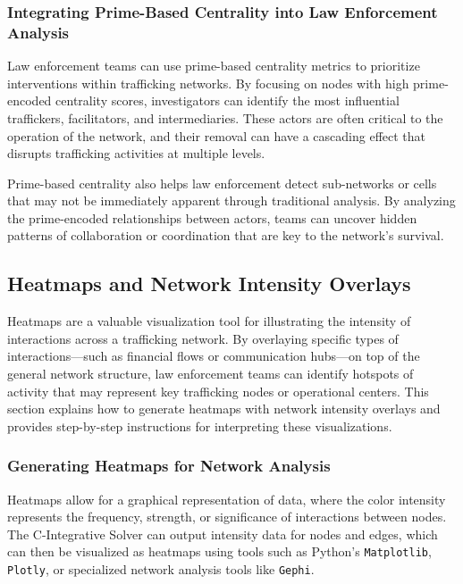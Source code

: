 \documentclass[%
 preprint, linenumbers,
 amsmath,amssymb,
 aps, physrev,
]{revtex4-2}
\begin{document}
\subsubsection{Integrating Prime-Based Centrality into Law Enforcement Analysis}

Law enforcement teams can use prime-based centrality metrics to prioritize interventions within trafficking networks. By focusing on nodes with high prime-encoded centrality scores, investigators can identify the most influential traffickers, facilitators, and intermediaries. These actors are often critical to the operation of the network, and their removal can have a cascading effect that disrupts trafficking activities at multiple levels.

Prime-based centrality also helps law enforcement detect sub-networks or cells that may not be immediately apparent through traditional analysis. By analyzing the prime-encoded relationships between actors, teams can uncover hidden patterns of collaboration or coordination that are key to the network’s survival.

\subsection{Heatmaps and Network Intensity Overlays}

Heatmaps are a valuable visualization tool for illustrating the intensity of interactions across a trafficking network. By overlaying specific types of interactions—such as financial flows or communication hubs—on top of the general network structure, law enforcement teams can identify hotspots of activity that may represent key trafficking nodes or operational centers. This section explains how to generate heatmaps with network intensity overlays and provides step-by-step instructions for interpreting these visualizations.

\subsubsection{Generating Heatmaps for Network Analysis}

Heatmaps allow for a graphical representation of data, where the color intensity represents the frequency, strength, or significance of interactions between nodes. The C-Integrative Solver can output intensity data for nodes and edges, which can then be visualized as heatmaps using tools such as Python's \texttt{Matplotlib}, \texttt{Plotly}, or specialized network analysis tools like \texttt{Gephi}.
\end{document}
